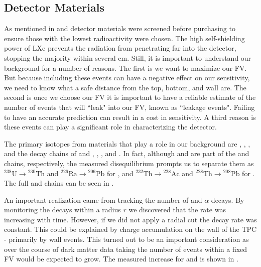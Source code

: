 {\subsection{Detector Materials}
\label{subsec:backgrounds_detector_materials}
As mentioned in  and  detector materials were screened before purchasing to ensure
those with the lowest radioactivity were chosen.  The high self-shielding power of LXe prevents the radiation from penetrating far into
the detector, stopping the majority within several cm.  Still, it is important to understand our background for a number of reasons.  The
first is we want to maximize our FV.  But because including these events can have a negative effect on our sensitivity, we need to know
what a safe distance from the top, bottom, and wall are.  The second is once we choose our FV it is important to have a reliable estimate
of the number of events that will ``leak" into our FV, known as ``leakage events".  Failing to have an accurate prediction can result in
a cost in sensitivity.  A third reason is these events can play a significant role in characterizing the detector.

The primary isotopes from materials that play a role in our background are , , , and the decay chains
of and , , , and .  In fact, although  and  are part of the
 and  chains, respectively, the measured disequilibrium prompts us to separate them as
$\mathrm{^{238}U} \rightarrow \mathrm{^{230}Th}$ and $\mathrm{^{226}Ra} \rightarrow \mathrm{^{206}Pb}$ for , and
$\mathrm{^{232}Th} \rightarrow \mathrm{^{228}Ac}$ and $\mathrm{^{228}Th} \rightarrow \mathrm{^{208}Pb}$ for .  The full
 and  chains can be seen in .

An important realization came from tracking the number of  and  $\alpha$-decays.  By monitoring the
decays within a radius $r$ we discovered that the rate was increasing with time.  However, if we did not apply a radial cut the decay rate
was constant.  This could be explained by charge accumulation on the wall of the TPC - primarily by wall events.  This turned out to be an
important consideration as over the course of dark matter data taking the number of events within a fixed FV would be expected to
grow.  The measured increase for  and  is shown in .


}
